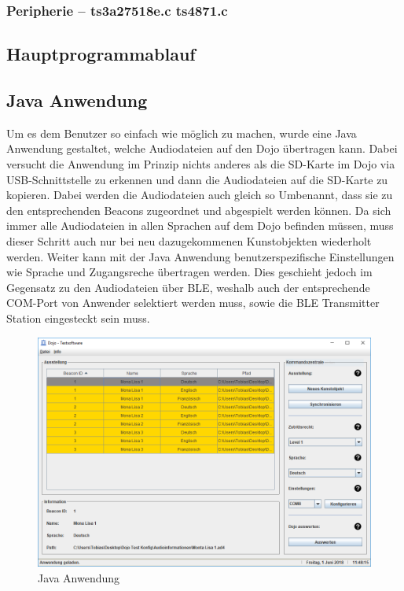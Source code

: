 \subsubsection{Peripherie -- ts3a27518e.c ts4871.c}

\subsection{Hauptprogrammablauf}


\subsection{Java Anwendung}

Um es dem Benutzer so einfach wie möglich zu machen, wurde eine Java Anwendung gestaltet, welche Audiodateien auf den Dojo übertragen kann. Dabei versucht die Anwendung im Prinzip nichts anderes als die SD-Karte im Dojo via USB-Schnittstelle zu erkennen und dann die Audiodateien auf die SD-Karte zu kopieren. Dabei werden die Audiodateien auch gleich so Umbenannt, dass sie zu den entsprechenden Beacons zugeordnet und abgespielt werden können. Da sich immer alle Audiodateien in allen Sprachen auf dem Dojo befinden müssen, muss dieser Schritt auch nur bei neu dazugekommenen Kunstobjekten wiederholt werden. Weiter kann mit der Java Anwendung benutzerspezifische Einstellungen wie Sprache und Zugangsreche übertragen werden. Dies geschieht jedoch im Gegensatz zu den Audiodateien über BLE, weshalb auch der entsprechende COM-Port von Anwender selektiert werden muss, sowie die BLE Transmitter Station eingesteckt sein muss.

\newpage

\begin{figure}[htb]
	\centering
	\includegraphics[width=\textwidth]{graphics/Java_Anwendung.png}
	\caption{Java Anwendung}
	\label{fig:Java Anwendung}
\end{figure}

